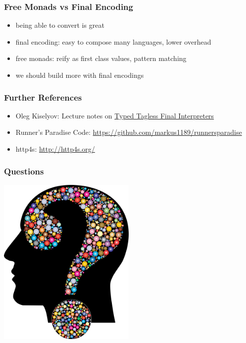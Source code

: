 \documentclass{beamer}
\begin{document}
\begin{frame}
  \frametitle{Free Monads vs Final Encoding}
  \begin{itemize}
  \item being able to convert is great
  \item final encoding: easy to compose many languages, lower overhead
  \item free monads: reify as first class values, pattern matching
  \item we should build more with final encodings
  \end{itemize}
\end{frame}

\begin{frame}
  \frametitle{Further References}
  \begin{itemize}
  \item Oleg Kiselyov: Lecture notes on
    \href{http://okmij.org/ftp/tagless-final/course/lecture.pdf}{Typed
      Tagless Final Interpreters}
  \item Runner's Paradise Code:
    \url{https://github.com/markus1189/runnersparadise}
  \item http4s: \url{http://http4s.org/}
  \end{itemize}
\end{frame}

\begin{frame}
  \frametitle{Questions}
  \begin{center}
    \includegraphics[width=0.5\textwidth]{../pics/questions.png}
  \end{center}
\end{frame}
\end{document}
